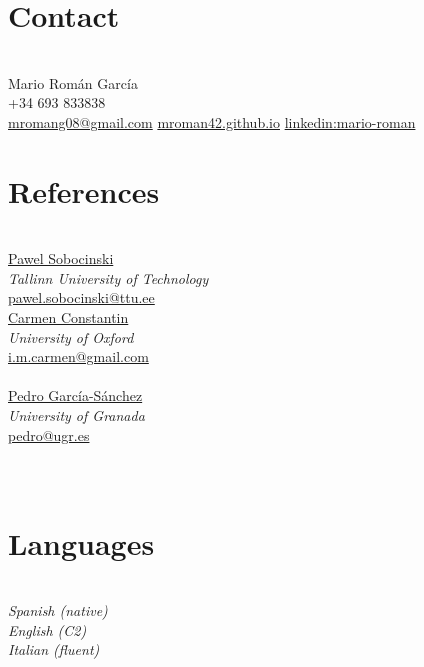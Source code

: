 \documentclass[nocolors]{friggeri-cv-a4}
\begin{document}

\begin{aside} %
  \section{Contact}\\
  Mario Román García\\
+34 693 833838\\
\href{mailto:mromang08@gmail.com}{mromang08@gmail.com}
\href{https://mroman42.github.io}{mroman42.github.io}
\href{https://www.linkedin.com/in/mario-roman}{linkedin:mario-roman}
\section{References}\\
\href{}{Pawel Sobocinski}\\
\textit{Tallinn University of Technology}\\
\href{mailto:pawel.sobocinski@ttu.ee}{pawel.sobocinski@ttu.ee }\\
\quad
\href{https://www.mansfield.ox.ac.uk/dr-carmen-constantin}{Carmen Constantin}\\
\textit{University of Oxford}\\
\href{mailto:i.m.carmen@gmail.com}{i.m.carmen@gmail.com}\\
\quad\\
\href{https://scholar.google.com/citations?user=gvq9UmMAAAAJ&hl=en&oi=ao}{Pedro García-Sánchez}\\
\textit{University of Granada}\\
\href{mailto:pedro@ugr.es}{pedro@ugr.es}\\
\quad\\
\quad\\



\section{Languages}\\
\textit{Spanish (native)\\
English (C2) \\
Italian (fluent)}

\end{aside}
\end{document}
